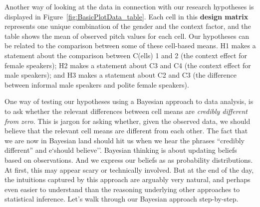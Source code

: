 \documentclass[nobib]{tufte-handout}
\newcommand{\tr}[1]{\textcolor{DarkOrange}{[tr: #1]}}
\begin{document}
Another way of looking at the data in connection with our research hypotheses is displayed in
Figure~\ref{fig:BasicPlotData_table}. Each cell in this \textbf{design matrix} represents one
unique combination of the gender and the context factor, and the table shows the mean of
observed pitch values for each cell.
%
%
Our hypotheses can be related to the comparison between some of these cell-based means.
H1 makes a statement about the comparison between C(ells) 1 and 2 (the context effect for female speakers); H2 makes a statement about C3 and C4 (the context effect for male speakers); and H3 makes a statement about C2 and C3 (the difference between informal male speakers and polite female speakers).

One way of testing our hypotheses using a Bayesian approach to data analysis, is to ask whether the relevant differences between cell means are \textit{credibly different from zero}. This is jargon for asking whether, given the observed data, we should believe that the relevant cell means are different from each other. The fact that we are now in Bayesian land should hit us when we hear the phrases ``credibly different'' and e`should believe''. Bayesian thinking is about updating beliefs based on observations. And we express our beliefs as as probability distributions. 
At first, this may appear scary or technically involved. But at the end of the day, the intuitions captured by this approach are arguably very natural, and perhaps even easier to understand than the reasoning underlying other approaches to statistical inference. Let's walk through our Bayesian approach step-by-step.
\end{document}
